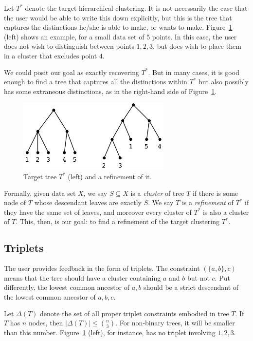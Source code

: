 Let $T^*$ denote the target hierarchical clustering. It is not necessarily the case that the user would be able to write this down explicitly, but this is the tree that captures the distinctions he/she is able to make, or wants to make. Figure~\ref{fig:refinement} (left) shows an example, for a small data set of 5 points. In this case, the user does not wish to distinguish between points $1,2,3$, but does wish to place them in a cluster that excludes point $4$.

We could posit our goal as exactly recovering $T^*$. But in many cases, it is good enough to find a tree that captures all the distinctions within $T^*$ but also possibly has some extraneous distinctions, as in the right-hand side of Figure~\ref{fig:refinement}.

\begin{figure}
    \centering
    \includegraphics[width=3in]{img/refinement.pdf}
    \caption{Target tree $T^*$ (left) and a refinement of it.}
    \label{fig:refinement}
\end{figure}

Formally, given data set $X$, we say $S \subseteq X$ is a {\it cluster} of tree $T$ if there is some node of $T$ whose descendant leaves are exactly $S$. We say $T$ is a {\it refinement} of $T^*$ if they have the same set of leaves, and moreover every cluster of $T^*$ is also a cluster of $T$. This, then, is our goal: to find a refinement of the target clustering $T^*$.

\subsection{Triplets}

The user provides feedback in the form of triplets. The constraint $(\{a,b\},c)$ means that the tree should have a cluster containing $a$ and $b$ but not $c$. Put differently, the lowest common ancestor of $a,b$ should be a strict descendant of the lowest common ancestor of $a,b,c$.

Let $\Delta(T)$ denote the set of all proper triplet constraints embodied in tree $T$. If $T$ has $n$ nodes, then $|\Delta(T)| \leq {n \choose 3}$. For non-binary trees, it will be smaller than this number. Figure~\ref{fig:refinement} (left), for instance, has no triplet involving $1,2,3$. 

